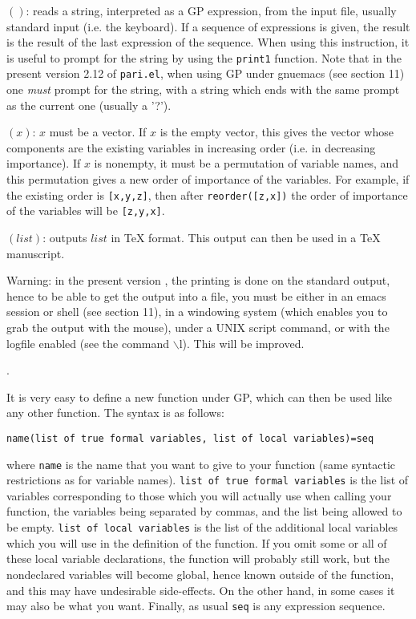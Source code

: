 $()$: reads a string, interpreted as a GP expression, from
the input file, usually standard input (i.e. the keyboard). If a sequence of
expressions is given, the result is the result of the last expression of the
sequence. When using this instruction, it is useful to prompt for the string
by using the {\tt print1} function. Note that in the present version 2.12 of
{\tt pari.el}, when using GP under gnuemacs (see section 11) one {\sl must\/}
prompt for the string, with a string which ends with the same prompt as the
current one (usually a '?').

$(x)$: $x$ must be a vector. If $x$ is the empty vector,
this gives the vector whose components are the existing variables in increasing
order (i.e. in decreasing importance). If $x$ is nonempty, it must be a permutation
of variable names, and this permutation gives a new order of importance of the variables.
For example, if the existing order is {\tt [x,y,z]}, then after {\tt reorder([z,x])} the
order of importance of the variables will be {\tt [z,y,x]}.

$(list)$: outputs $list$ in \TeX{} format. This
output can then be used in a \TeX{} manuscript. 

Warning: in the present version \vers, the printing is done on the standard
output, hence to be able to get the output into a file, you must be either
in an emacs session or shell (see section 11), in a windowing system (which enables
you to grab the output with the mouse), under a UNIX script command, or with
the logfile enabled (see the command $\backslash$l). This will be improved.

\smallskip
{}.

It is very easy to define a new function under GP, which can then be used like any other
function. The syntax is as follows:

{\tt name(list of true formal variables, list of local variables)=seq}

where {\tt name} is the name that you want to give to your function (same syntactic
restrictions as for variable names). {\tt list of true formal variables} is the list
of variables corresponding to those which you will actually use when calling your
function, the variables being separated by commas, and the list being allowed to be
empty. {\tt list of local variables} is the list of the additional local variables
which you will use in the definition of the function. If you omit some or all of these
local variable declarations, the function will probably still work, but the nondeclared
variables will become global, hence known outside of the function, and this may have
undesirable side-effects. On the other hand, in some cases it may also be what you
want. Finally, as usual {\tt seq} is any expression sequence.

